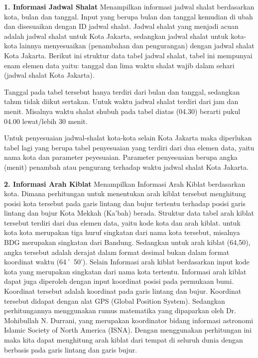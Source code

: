 \documentclass{jtetiproposalskripsi}
\begin{document}
\textbf{1.	Informasi Jadwal Shalat}
Menampilkan informasi jadwal shalat berdasarkan kota, bulan dan tanggal. Input yang berupa bulan dan tanggal kemudian di ubah dan disesuaikan dengan ID jadwal shalat. Jadwal shalat yang menjadi acuan adalah jadwal shalat untuk Kota Jakarta, sedangkan jadwal shalat untuk kota-kota lainnya menyesuaikan (penambahan dan pengurangan) dengan jadwal shalat Kota Jakarta.
Berikut ini struktur data tabel jadwal shalat, tabel ini mempunyai enam elemen data yaitu: tanggal dan lima waktu shalat wajib dalam sehari (jadwal shalat Kota Jakarta).

Tanggal pada tabel tersebut hanya terdiri dari bulan dan tanggal, sedangkan tahun tidak diikut sertakan. Untuk waktu jadwal shalat terdiri dari jam dan menit. Misalnya waktu shalat shubuh pada tabel diatas (04.30) berarti pukul 04.00 lewat/lebih 30 menit.

Untuk penyesuaian jadwal-shalat kota-kota selain Kota Jakarta maka diperlukan tabel lagi yang berupa tabel penyesuaian yang terdiri dari dua elemen data, yaitu nama kota dan parameter peyesuaian. Parameter penyesuaian berupa angka (menit) penambah atau pengurang terhadap waktu jadwal shalat Kota Jakarta. 


\textbf{2.	Informasi Arah Kiblat}
Menampilkan Informasi Arah Kiblat berdasarkan kota. Dimana perhitungan untuk menentukan arah kiblat tersebut menghitung posisi kota tersebut pada garis lintang dan bujur tertentu terhadap posisi garis lintang dan bujur Kota Mekkah (Ka’bah) berada.
Struktur data tabel arah kiblat tersebut terdiri dari dua elemen data, yaitu kode kota dan arah kiblat. 
untuk kota kota merupakan tiga huruf singkatan dari nama kota tersebut, misalnya BDG merupakan singkatan dari Bandung. Sedangkan untuk arah kiblat (64,50), angka tersebut adalah derajat dalam format desimal bukan dalam format koordinat waktu (64˚ 50’).
Selain Informasi arah kiblat berdasarkan input kode kota yang merupakan singkatan dari nama kota tertentu. Informasi arah kiblat dapat juga diperoleh dengan input koordinat posisi pada permukaan bumi. Koordinat tersebut adalah koordinat pada garis lintang dan bujur. Koordinat tersebut didapat dengan alat GPS (Global Position System).
Sedangkan perhitungannya menggunakan rumus matematika yang dipaparkan oleh Dr. Mohibullah N. Durrani, yang merupakan koordinator bidang informasi astronomi Islamic Society of  North America (ISNA). Dengan menggunakan perhitungan ini maka kita dapat menghitung arah kiblat dari tempat di seluruh dunia dengan berbasis pada garis lintang dan garis bujur.
\end{document}
